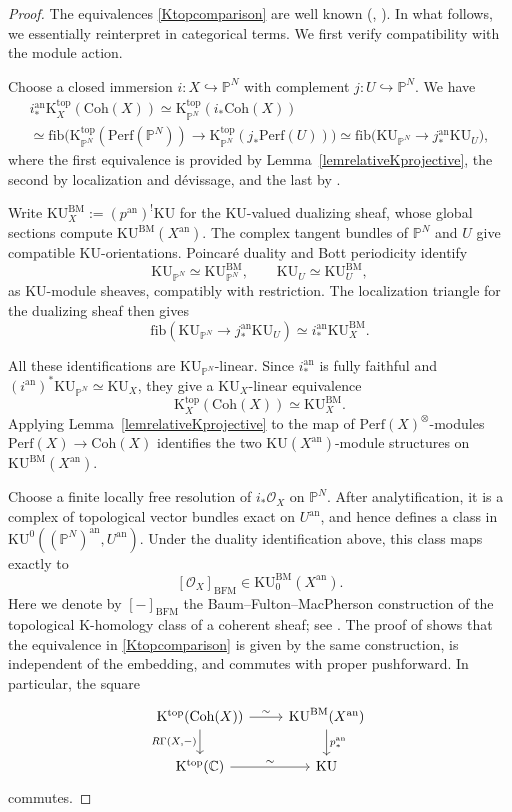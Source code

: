 \documentclass{amsart}
\theoremstyle{plain}
\theoremstyle{definition}
\newcommand{\ra}{\rightarrow}
\newcommand{\bbC}{\mathbb{C}}
\newcommand{\Perf}{\mathrm{Perf}}
\newcommand{\fib}{\mathrm{fib}}
\newcommand{\bbP}{\mathbb{P}}
\newcommand{\K}{\mathrm{K}}
\newcommand{\KU}{\mathrm{KU}}
\newcommand{\Coh}{\mathrm{Coh}}
\newcommand{\an}{\mathrm{an}}
\begin{document}
\begin{proof}
The equivalences \eqref{Ktopcomparison} are well known (\cite[Proposition~4.32]{Bla16}, \cite[Theorem~2.10]{HLP20}). In what follows, we essentially reinterpret \cite[Sections 4-5]{BFM79} in categorical terms.
We first verify compatibility with the module action.

Choose a closed immersion $i:X\hookrightarrow\mathbb P^N$
with complement $j:U\hookrightarrow\mathbb P^N$. We have
\[
\begin{gathered}
i^\an_*\K^{\mathrm{top}}_X(\Coh(X))
\simeq
\K^{\mathrm{top}}_{\bbP^N}(i_*\Coh(X))
\\
\simeq
\fib\bigl(
\K^{\mathrm{top}}_{\bbP^N}(\Perf(\bbP^N))
\ra
\K^{\mathrm{top}}_{\bbP^N}(j_*\Perf(U))
\bigr)
\simeq
\fib\bigl(\KU_{\bbP^N}\ra j^\an_*\KU_U\bigr),
\end{gathered}
\]
where the first equivalence is provided by Lemma~\ref{lemrelativeKprojective}, the second by localization and d\'evissage, and the last by \cite[Lemma 4.4]{PT26}.

Write $\KU^{\mathrm{BM}}_X:=(p^\an)^!\KU$
for the $\KU$-valued dualizing sheaf, whose global sections compute $\KU^{\mathrm{BM}}(X^\an)$.
The complex tangent bundles of $\mathbb P^N$ and $U$
give compatible $\KU$-orientations. Poincar\'e duality and Bott periodicity identify
\[
\KU_{\mathbb P^N}\simeq\KU^{\mathrm{BM}}_{\mathbb P^N},
\qquad
\KU_U\simeq\KU^{\mathrm{BM}}_U,
\]
as $\KU$-module sheaves, compatibly with restriction.
The localization triangle for the dualizing sheaf then gives
\[
\fib(\KU_{\mathbb P^N}\longrightarrow j^\an_*\KU_U)
\simeq i^\an_*\KU^{\mathrm{BM}}_X.
\]

All these identifications are
$\KU_{\bbP^N}$-linear. Since $i^\an_*$ is fully faithful and $(i^\an)^*\KU_{\bbP^N}\simeq\KU_X$, they give a
$\KU_X$-linear equivalence
\[
\K^{\mathrm{top}}_X(\Coh(X))
\simeq\KU^{\mathrm{BM}}_X.
\]
Applying Lemma~\ref{lemrelativeKprojective} to the map of $\Perf(X)^\otimes$-modules $\Perf(X) \ra \Coh(X)$ identifies the two $\KU(X^\an)$-module structures on $\KU^{\mathrm{BM}}(X^\an)$.




Choose a finite locally free resolution of $i_*\mathcal O_X$
on $\mathbb P^N$. After analytification, it is a complex of topological vector bundles exact on $U^\an$, and hence defines a class in $\KU^0((\mathbb P^N)^\an,U^\an)$.
Under the duality identification above, this class maps exactly to
\[
[\mathcal O_X]_{\mathrm{BFM}}
\in\KU^{\mathrm{BM}}_0(X^\an).
\]
Here we denote by $[-]_{\mathrm{BFM}}$ the Baum--Fulton--MacPherson construction of the topological $\K$-homology class of a coherent sheaf; see \cite[Sections~4--5]{BFM79}. The proof of \cite[Lemma~2.9]{HLP20} shows that the equivalence in \eqref{Ktopcomparison} is given by the same construction, is independent of the embedding, and commutes with proper pushforward. In particular, the square
\[
\begin{tikzcd}
\K^{\mathrm{top}}(\Coh(X))
  \arrow[r,"\sim"]
  \arrow[d,"{R\Gamma(X,-)}"']
&
\KU^{\mathrm{BM}}(X^\an)
  \arrow[d,"{p^\an_*}"]
\\
\K^{\mathrm{top}}(\bbC)
  \arrow[r,"\sim"]
&
\KU
\end{tikzcd}
\]
commutes.


\end{proof}
\end{document}
